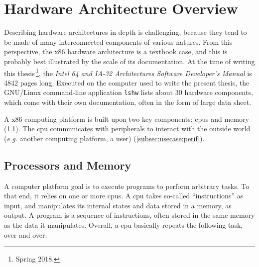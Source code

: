 \section{Hardware Architecture Overview}
\label{sec:usecase:architecture}

Describing hardware architectures in depth is challenging, because they tend to
be made of many interconnected components of various natures.
%
From this perspective, the x86 hardware architecture is a textbook case, and
this is probably best illustrated by the scale of its documentation.
%
At the time of writing this thesis\,\footnote{Spring 2018.}, the \emph{Intel 64
  and IA-32 Architectures Software Developer’s Manual} is 4842 pages long.
%
Executed on the computer used to write the present thesis, the GNU/Linux
command-line application \texttt{lshw} lists about 30 hardware components, which
come with their own documentation, often in the form of large data sheet.
%

A x86 computing platform is built upon two key components: \acp{cpu} and memory
(\ref{subsec:usecase:cpumem}).
%
The \ac{cpu} communicates with peripherals to interact with the outside world
(\emph{e.g.} another computing platform, a user) (\ref{subsec:usecase:perif}).
%

\subsection{Processors and Memory}
\label{subsec:usecase:cpumem}

A computer platform goal is to execute programs to perform arbitrary tasks.
%
To that end, it relies on one or more \acp{cpu}.
%
%
A \ac{cpu} takes so-called ``instructions'' as input, and manipulates its
internal states and data stored in a memory, as output.
%
A program is a sequence of instructions, often stored in the same memory as the
data it manipulates.
%
%
Overall, a \ac{cpu} basically repeats the following task, over and over:

